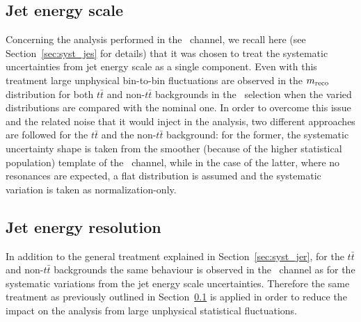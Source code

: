\subsection{Jet energy scale}\label{sec:wbx_syst_jes}
Concerning the analysis performed in the \tight\ channel,
we recall here (see Section~\ref{sec:syst_jes} for details)
that it was chosen to treat the systematic uncertainties from
jet energy scale as a single component. Even with this treatment
large unphysical bin-to-bin fluctuations are observed
in the $m_{\rm reco}$ distribution for both $t\bar{t}$ and non-$t\bar{t}$
backgrounds in the \tight\ selection when the varied distributions
are compared with the nominal one. In order to overcome this issue
and the related noise that it would inject in the analysis, two different
approaches are followed for the $t\bar{t}$ and the non-$t\bar{t}$ background:
for the former, the systematic uncertainty shape is taken from the smoother
(because of the higher statistical population) template of the \loose\
channel, while in the case of the latter, where no resonances are expected,
a flat distribution is assumed and the systematic variation is taken as
normalization-only.

\subsection{Jet energy resolution}
In addition to the general treatment explained in Section~\ref{sec:syst_jer},
for the $t\bar{t}$ and non-$t\bar{t}$ backgrounds 
the same behaviour is observed in the \tight\ channel
as for the systematic variations from the jet energy scale uncertainties.
Therefore the same treatment as previously outlined in 
Section~\ref{sec:wbx_syst_jes} is applied in order to 
reduce the impact on the analysis from
large unphysical statistical fluctuations.

